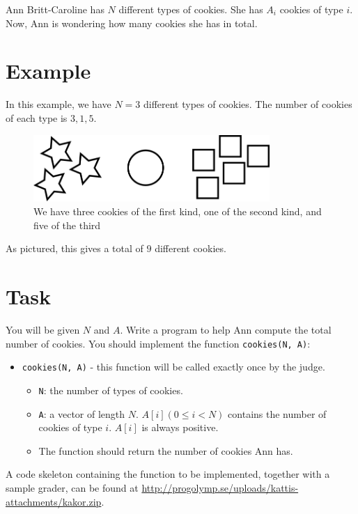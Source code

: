 \newcommand\version{v1}
Ann Britt-Caroline has $N$ different types of cookies. She has $A_i$ cookies of type $i$. Now, Ann is wondering how many cookies she has in total.

\section*{Example}
In this example, we have $N = 3$ different types of cookies. The number of cookies of each type is $3, 1, 5$.

\begin{figure}[h!]
  \centering
  \includegraphics[width=0.8\textwidth]{sample.png}
  \caption{We have three cookies of the first kind, one of the second kind, and five of the third}
\end{figure}

As pictured, this gives a total of $9$ different cookies.

\section*{Task}
You will be given $N$ and $A$. Write a program to help Ann compute the total number of cookies. You should implement the function \texttt{cookies(N, A)}:
\begin{itemize}
  \item \texttt{cookies(N, A)} - this function will be called exactly once by the judge.
  \begin{itemize}
    \item \texttt{N}: the number of types of cookies.
    \item \texttt{A}: a vector of length $N$. $A[i] (0 \le i < N)$ contains the number of cookies of type $i$. $A[i]$ is always positive.
    \item The function should return the number of cookies Ann has.
  \end{itemize}
\end{itemize}

A code skeleton containing the function to be implemented, together with a sample grader, can be found at
\url{http://progolymp.se/uploads/kattis-attachments/kakor.zip}.


